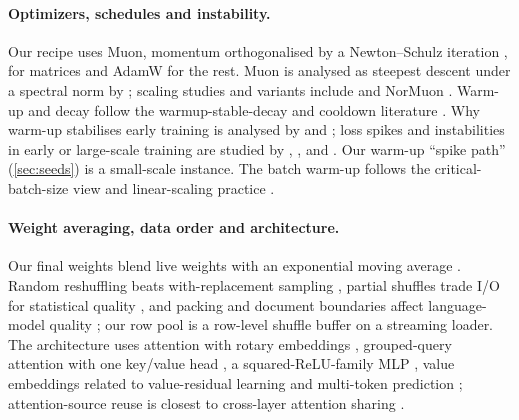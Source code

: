 \paragraph{Optimizers, schedules and instability.} Our recipe uses Muon, momentum orthogonalised by a Newton--Schulz
iteration \citep{jordan2024muon,bjorck1971orthogonal}, for matrices and AdamW
\citep{kingma2015adam,loshchilov2019adamw} for the rest. Muon is analysed as steepest descent under a spectral norm
by \citet{bernstein2024anthology,bernstein2024modular}; scaling studies and variants include
\citet{liu2025muonscalable} and NorMuon \citep{li2025normuon}. Warm-up and decay follow the warmup-stable-decay and
cooldown literature \citep{loshchilov2017sgdr,hu2024minicpm,hagele2024scaling,defazio2024schedulefree}. Why warm-up
stabilises early training is analysed by \citet{liu2020radam} and \citet{xiong2020layernorm}; loss spikes and
instabilities in early or large-scale training are studied by \citet{wortsman2024proxies}, \citet{chowdhery2023palm},
\citet{molybog2023adam} and \citet{takase2025spike}. Our warm-up ``spike path'' (\cref{sec:seeds}) is a small-scale
instance. The batch warm-up follows the critical-batch-size view \citep{mccandlish2018largebatch} and
linear-scaling practice \citep{goyal2017imagenet}.

\paragraph{Weight averaging, data order and architecture.} Our final weights blend live weights with an
exponential moving average \citep{polyak1992averaging,izmailov2018swa,kaddour2022lawa,sanyal2023earlyavg,moralesbrotons2024ema,busbridge2023ema}.
Random reshuffling beats with-replacement sampling \citep{gurbuzbalaban2019reshuffling,mishchenko2020reshuffling},
partial shuffles trade I/O for statistical quality \citep{xu2022corgipile}, and packing and document boundaries
affect language-model quality \citep{krell2021packing,zhao2024sequence,ding2024truncations}; our row pool is a
row-level shuffle buffer on a streaming loader. The architecture uses attention \citep{vaswani2017attention} with
rotary embeddings \citep{su2021roformer}, grouped-query attention with one key/value head
\citep{shazeer2019mqa,ainslie2023gqa}, a squared-ReLU-family MLP \citep{so2021primer}, value embeddings related to
value-residual learning \citep{zhou2024valueresidual} and multi-token prediction \citep{gloeckle2024multitoken};
attention-source reuse is closest to cross-layer attention sharing \citep{brandon2024cla,xiao2019sharing}.
